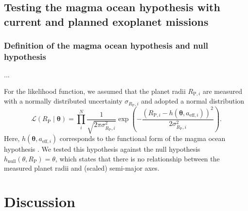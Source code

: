 \documentclass[modern]{aastex631}
\begin{document}
\subsection{Testing the magma ocean hypothesis with current and planned exoplanet missions}

\subsubsection{Definition of the magma ocean hypothesis and null hypothesis}
...

For the likelihood function, we assumed that the planet radii $R_{\mathrm{P}, i}$ are measured with a normally distributed uncertainty $\sigma_{R_\mathrm{P}, i}$ and adopted a normal distribution
\begin{equation}
    \mathcal{L}(R_\mathrm{P} \mid \boldsymbol{\theta})=\prod_{i}^{N} \frac{1}{\sqrt{2 \pi \sigma_{R_\mathrm{P}, i}^{2}}} \exp \left(-\frac{\left(R_{\mathrm{P}, i}-h\left(\boldsymbol{\theta}, a_{\mathrm{eff}, i}\right)\right)^{2}}{2 \sigma_{R_\mathrm{P}, i}^{2}}\right).
\end{equation}
Here, $h\left(\boldsymbol{\theta}, a_{\mathrm{eff}, i}\right)$ corresponds to the functional form of the magma ocean hypothesis .
We tested this hypothesis against the null hypothesis $h_\mathrm{null} (\theta, R_\mathrm{P}) = \theta$, which states that there is no relationship between the measured planet radii and (scaled) semi-major axes.


\section{Discussion}
\end{document}
